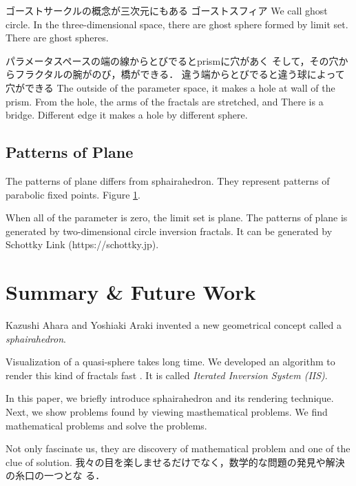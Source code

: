 \documentclass[dvipdfmx]{interact}
\theoremstyle{plain}%
\theoremstyle{definition}
\theoremstyle{remark}
\theoremstyle{problemstyle}
\begin{document}
ゴーストサークルの概念が三次元にもある
ゴーストスフィア
We call ghost circle. In the three-dimensional space, there are ghost
sphere formed by limit set.
There are ghost spheres.

パラメータスペースの端の線からとびでるとprismに穴があく
そして，その穴からフラクタルの腕がのび，橋ができる．
違う端からとびでると違う球によって穴ができる
The outside of the parameter space, it makes a hole at wall of the
prism. From the hole, the arms of the fractals are stretched, and 
There is a bridge.
Different edge it makes a hole by different sphere.


\subsection{Patterns of Plane}
The patterns of plane differs from sphairahedron.
They represent patterns of parabolic fixed points.
Figure \ref{}.

When all of the parameter is zero, the limit set is plane.
The patterns of plane is generated by two-dimensional circle inversion
fractals. It can be generated by Schottky Link (https://schottky.jp).

\section{Summary \& Future Work}
Kazushi Ahara and Yoshiaki Araki invented a new geometrical concept
called a \textit{sphairahedron}.

Visualization of a quasi-sphere takes long time.
We developed an algorithm to render this kind of fractals fast
\cite{bridges2018}.
 It is called \textit{Iterated Inversion System (IIS)}.

In this paper, we briefly introduce sphairahedron and its rendering
technique.
Next, we show problems found by viewing masthematical problems.
We find mathematical problems and solve the problems.

Not only fascinate us, they are discovery of mathematical problem
and one of the clue of solution.
我々の目を楽しませるだけでなく，数学的な問題の発見や解決の糸口の一つとな
る．
\end{document}
